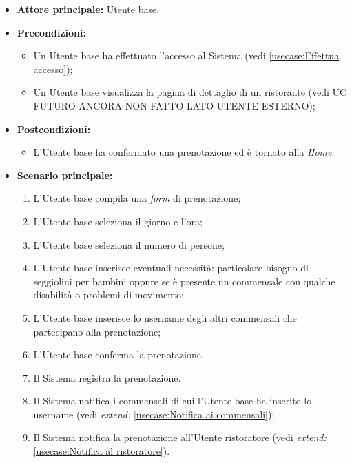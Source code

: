 \label{usecase:Prenotazione di un tavolo}
\begin{itemize}
	\item \textbf{Attore principale:} Utente base.
	\item \textbf{Precondizioni:}
		\begin{itemize}
			\item Un Utente base ha effettuato l'accesso al Sistema (vedi \autoref{usecase:Effettua accesso});
			\item Un Utente base visualizza la pagina di dettaglio di un ristorante (vedi UC FUTURO ANCORA NON FATTO LATO UTENTE ESTERNO);
		\end{itemize}
	\item \textbf{Postcondizioni:}
		\begin{itemize}
			\item L'Utente base ha confermato una prenotazione ed è tornato alla \textit{Home}.
		\end{itemize} 
	      
	\item \textbf{Scenario principale:}
	      \begin{enumerate}
		      \item L'Utente base compila una \textit{form} di prenotazione;
		      \item L'Utente base seleziona il giorno e l'ora;
		      \item L'Utente base seleziona il numero di persone;
		      \item L'Utente base inserisce eventuali necessità: particolare bisogno di seggiolini per bambini oppure se è presente un commensale con qualche disabilità o problemi di movimento;
		      \item L'Utente base inserisce lo username degli altri commensali che partecipano alla prenotazione;
		      \item L'Utente base conferma la prenotazione.
		      \item Il Sistema registra la prenotazione.
		      \item Il Sistema notifica i commensali di cui l'Utente base ha inserito lo username (vedi \textit{extend:} \autoref{usecase:Notifica ai commensali});
		      \item Il Sistema notifica la prenotazione all'Utente ristoratore (vedi \textit{extend:} \autoref{usecase:Notifica al ristoratore}).
	      \end{enumerate}


\end{itemize}
